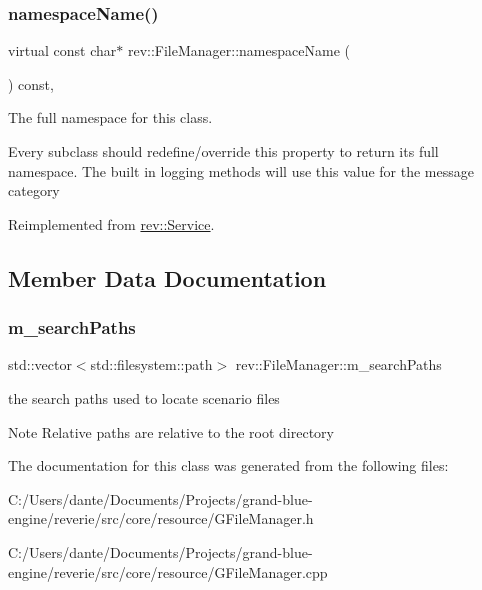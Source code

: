 \subsubsection{\texorpdfstring{namespaceName()}{namespaceName()}}
{\footnotesize\ttfamily virtual const char$\ast$ rev\+::\+File\+Manager\+::namespace\+Name (\begin{DoxyParamCaption}{ }\end{DoxyParamCaption}) const\hspace{0.3cm}{\ttfamily [inline]}, {\ttfamily [virtual]}}



The full namespace for this class. 

Every subclass should redefine/override this property to return its full namespace. The built in logging methods will use this value for the message category 

Reimplemented from \mbox{\hyperlink{classrev_1_1_service_a831f5bf8c53584ec830aaee38ea58e7b}{rev\+::\+Service}}.



\subsection{Member Data Documentation}
\mbox{\label{classrev_1_1_file_manager_aa73611e8b6e1c939e656ec13dcd6cbe3}} 
\subsubsection{\texorpdfstring{m\_searchPaths}{m\_searchPaths}}
{\footnotesize\ttfamily std\+::vector$<$std\+::filesystem\+::path$>$ rev\+::\+File\+Manager\+::m\+\_\+search\+Paths\hspace{0.3cm}{\ttfamily [protected]}}



the search paths used to locate scenario files 

\begin{DoxyNote}{Note}
Relative paths are relative to the root directory 
\end{DoxyNote}


The documentation for this class was generated from the following files\+:\begin{DoxyCompactItemize}
\item 
C\+:/\+Users/dante/\+Documents/\+Projects/grand-\/blue-\/engine/reverie/src/core/resource/G\+File\+Manager.\+h\item 
C\+:/\+Users/dante/\+Documents/\+Projects/grand-\/blue-\/engine/reverie/src/core/resource/G\+File\+Manager.\+cpp\end{DoxyCompactItemize}
